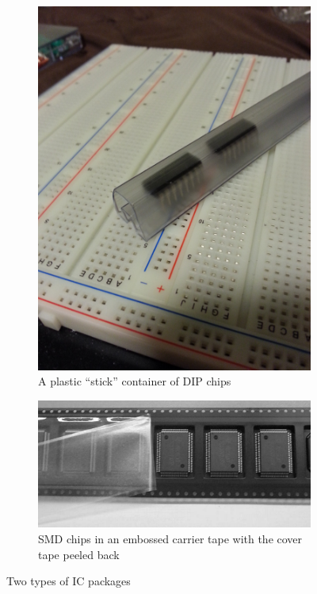 \documentclass[12pt,draft,oneside]{article}
\begin{document}
\begin{figure}
  \centering
  \begin{subfigure}[b]{0.5\textwidth}
    \centering
    \includegraphics[width=\textwidth]{2012-09-11_dip-stick-tube.jpg}
    \caption{A plastic ``stick'' container of DIP chips}
  \end{subfigure}%
  \begin{subfigure}[b]{0.5\textwidth}
    \centering
    \includegraphics[width=\textwidth]{2012-12-03_smd-tape.png}
    \caption{SMD chips in an embossed carrier tape with the cover tape peeled back}
  \end{subfigure}%
  \caption{Two types of IC packages}
  \label{fig:packages}
\end{figure}
\end{document}
